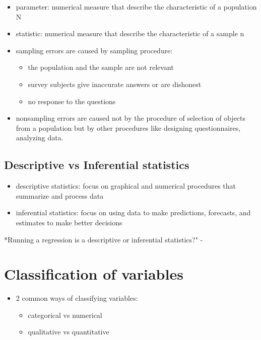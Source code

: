 \documentclass[
]{article}
\providecommand{\tightlist}{%
  \setlength{\itemsep}{0pt}\setlength{\parskip}{0pt}}
\begin{document}
\begin{itemize}
\item
  parameter: numerical measure that describe the characteristic of a
  population N
\item
  statistic: numerical measure that describe the characteristic of a
  sample n
\item
  sampling errors are caused by sampling procedure:

  \begin{itemize}
  \tightlist
  \item
    the population and the sample are not relevant
  \item
    survey subjects give inaccurate answers or are dishonest
  \item
    no response to the questions
  \end{itemize}
\item
  nonsampling errors are caused not by the procedure of selection of
  objects from a population but by other procedures like designing
  questionnaires, analyzing data.
\end{itemize}

\hypertarget{descriptive-vs-inferential-statistics}{%
\subsection{Descriptive vs Inferential
statistics}\label{descriptive-vs-inferential-statistics}}

\begin{itemize}
\tightlist
\item
  descriptive statistics: focus on graphical and numerical procedures
  that summarize and process data
\item
  inferential statistics: focus on using data to make predictions,
  forecasts, and estimates to make better decisions
\end{itemize}

*Running a regression is a descriptive or inferential statistics?" -

\hypertarget{classification-of-variables}{%
\section{Classification of
variables}\label{classification-of-variables}}

\begin{itemize}
\item
  2 common ways of classifying variables:

  \begin{itemize}
  \tightlist
  \item
    categorical vs numerical
  \item
    qualitative vs quantitative
  \end{itemize}
\end{itemize}
\end{document}
